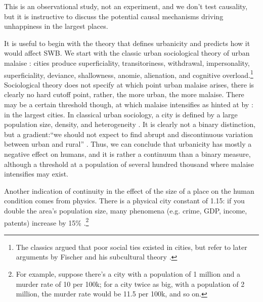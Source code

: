 \documentclass[10pt, letterpaper]{article}
\begin{document}
This is an observational study, not an experiment, and we don't test causality,
but it is instructive to discuss the potential causal mechanisms driving unhappiness in the largest places.

It is useful to begin with the theory that defines urbanicity and predicts how it would affect SWB. 
We start with the classic urban sociological theory of urban malaise
 \citep{tonnies57,wirth38,simmel03,park15,park84}: cities produce superficiality,
transitoriness, withdrawal, impersonality, superficiality, deviance,
shallowness, anomie, alienation, and cognitive overload.\footnote{The classics
  argued that poor social ties existed in cities, but refer to later arguments by Fischer and his subcultural theory \citep{fischer95,fischer75,fischer72}.} 
Sociological theory does not specify at which point urban malaise arises, there is clearly no hard
cutoff point, rather, the more urban, the more malaise. There may be a certain
threshold though, at which malaise intensifies as hinted at by
\citet{fischer73}: in the largest cities.
In classical urban sociology, a city is defined by a large population size,  density,
and heterogeneity \citep{wirth38}. It is clearly not a binary distinction,
but a gradient:``we should not expect to find abrupt and discontinuous variation
between urban and rural'' \citep[][p. 2]{wirth38}. Thus, we can conclude that urbanicity has mostly a negative effect on humans, and it is rather a continuum than a binary measure, although a threshold at a population of several hundred thousand where malaise intensifies may exist.

Another indication of continuity in the effect of the size of a place on the human condition
comes from physics. There is a physical city constant of 1.15: if you double the
area's population size, many phenomena (e.g. crime, GDP, income, patents)
increase by 15\%
\citep{blissCL_nov4_14,bettencourt10,bettencourt10b,bettencourt07}.\footnote{For
  example, suppose there's a city with a population of 1 million and a murder
  rate of 10 per 100k; for a city twice as big, with a population of 2 million, the murder rate would be 11.5 per 100k, and so on.} 
\end{document}
